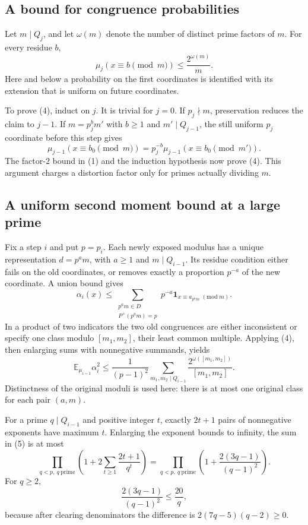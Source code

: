\subsection{A bound for congruence probabilities}
Let $m\mid Q_j$, and let $\omega(m)$ denote the number of distinct prime factors of $m$. For every residue $b$,
\[
 \mu_j(x\equiv b\pmod m)\le\frac{2^{\omega(m)}}m.
\tag{4}
\]
Here and below a probability on the first coordinates is identified with its extension that is uniform on future coordinates.

To prove (4), induct on $j$. It is trivial for $j=0$. If $p_j\nmid m$, preservation reduces the claim to $j-1$. If $m=p_j^b m'$ with $b\ge1$ and $m'\mid Q_{j-1}$, the still uniform $p_j$ coordinate before this step gives
\[
 \mu_{j-1}(x\equiv b_0\pmod m)
 =p_j^{-b}\mu_{j-1}(x\equiv b_0\pmod {m'}).
\]
The factor-$2$ bound in (1) and the induction hypothesis now prove (4). This argument charges a distortion factor only for primes actually dividing $m$.

\subsection{A uniform second moment bound at a large prime}
Fix a step $i$ and put $p=p_i$. Each newly exposed modulus has a unique representation $d=p^a m$, with $a\ge1$ and $m\mid Q_{i-1}$. Its residue condition either fails on the old coordinates, or removes exactly a proportion $p^{-a}$ of the new coordinate. A union bound gives
\[
 \alpha_i(x)\le
 \sum_{\substack{p^a m\in D\\P^+(p^a m)=p}}
  p^{-a}\mathbf 1_{x\equiv a_{p^a m}\; (\mathrm{mod}\;m)}.
\]
In a product of two indicators the two old congruences are either inconsistent or specify one class modulo $[m_1,m_2]$, their least common multiple. Applying (4), then enlarging sums with nonnegative summands, yields
\[
 \mathbb E_{\mu_{i-1}}\alpha_i^2
 \le\frac1{(p-1)^2}
 \sum_{m_1,m_2\mid Q_{i-1}}
 \frac{2^{\omega([m_1,m_2])}}{[m_1,m_2]}.
\tag{5}
\]
Distinctness of the original moduli is used here: there is at most one original class for each pair $(a,m)$.

For a prime $q\mid Q_{i-1}$ and positive integer $t$, exactly $2t+1$ pairs of nonnegative exponents have maximum $t$. Enlarging the exponent bounds to infinity, the sum in (5) is at most
\[
 \prod_{q<p,\ q\ \mathrm{prime}}
 \left(1+2\sum_{t\ge1}\frac{2t+1}{q^t}\right)
 =\prod_{q<p,\ q\ \mathrm{prime}}
 \left(1+\frac{2(3q-1)}{(q-1)^2}\right).
\tag{6}
\]
For $q\ge2$,
\[
 \frac{2(3q-1)}{(q-1)^2}\le\frac{20}q,
\]
because after clearing denominators the difference is
$2(7q-5)(q-2)\ge0$.


